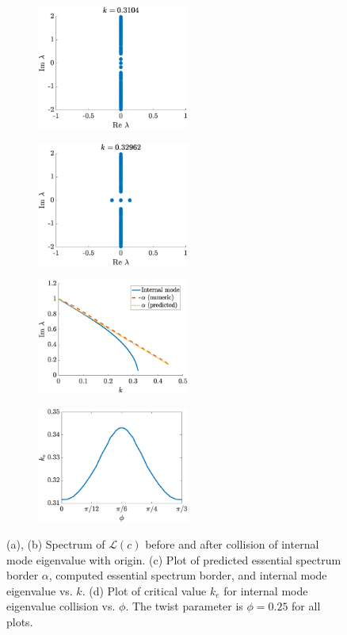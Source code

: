 \documentclass[11pt,reqno]{amsart}
\def\calL{{\mathcal L}}
\begin{document}
\begin{figure}
    \centering
    \begin{subfigure}{0.4\linewidth}
        \caption{}
        \label{fig:phi0speca}
        \includegraphics[width=5cm]{phi025spec2.eps}
    \end{subfigure}
    \begin{subfigure}{0.4\linewidth}
        \caption{}
        \label{fig:phi0specb}
        \includegraphics[width=5cm]{phi025spec3.eps}
    \end{subfigure}
    \begin{subfigure}{0.4\linewidth}
        \caption{}
        \label{fig:phi0specc}
        \includegraphics[width=5cm]{phi025speck.eps}
    \end{subfigure}
    \begin{subfigure}{0.4\linewidth}
        \caption{}
        \label{fig:phi0specd}
        \includegraphics[width=5cm]{keplot.eps}
    \end{subfigure}
    \caption{(a), (b) Spectrum of $\calL(c)$ before and after collision of internal mode eigenvalue with origin. (c) Plot of predicted essential spectrum border $\alpha$, computed essential spectrum border, and internal mode eigenvalue vs. $k$. (d) Plot of critical value $k_e$ for internal mode eigenvalue collision vs. $\phi$. The twist parameter is $\phi = 0.25$ for all plots.}
    \label{fig:phi0spec}
\end{figure}
\end{document}
